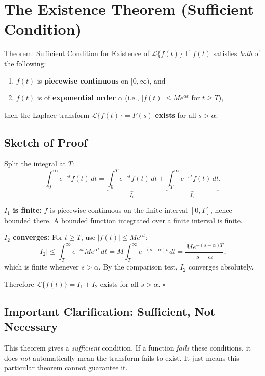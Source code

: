 \documentclass[12pt,a4paper]{article}
\begin{document}
\section{The Existence Theorem (Sufficient Condition)}

\begin{infobox}{Theorem: Sufficient Condition for Existence of $\mathcal{L}\{f(t)\}$}
If $f(t)$ satisfies \emph{both} of the following:
\begin{enumerate}[label=(\roman*)]
  \item $f(t)$ is \textbf{piecewise continuous} on $[0, \infty)$, and
  \item $f(t)$ is of \textbf{exponential order} $\alpha$ (i.e., $|f(t)| \leq M e^{\alpha t}$ for $t \geq T$),
\end{enumerate}
then the Laplace transform $\mathcal{L}\{f(t)\} = F(s)$ \textbf{exists} for all $s > \alpha$.
\end{infobox}

\subsection{Sketch of Proof}

Split the integral at $T$:
\[
  \int_0^{\infty} e^{-st} f(t)\, dt = \underbrace{\int_0^{T} e^{-st} f(t)\, dt}_{I_1} + \underbrace{\int_T^{\infty} e^{-st} f(t)\, dt}_{I_2}.
\]

\textbf{$I_1$ is finite:} $f$ is piecewise continuous on the finite interval $[0,T]$, hence bounded there. A bounded function integrated over a finite interval is finite.

\textbf{$I_2$ converges:} For $t \geq T$, use $|f(t)| \leq M e^{\alpha t}$:
\[
  |I_2| \leq \int_T^{\infty} e^{-st} M e^{\alpha t}\, dt = M \int_T^{\infty} e^{-(\text{s}-\alpha)t}\, dt = \frac{M e^{-(s-\alpha)T}}{s - \alpha},
\]
which is finite whenever $s > \alpha$. By the comparison test, $I_2$ converges absolutely.

Therefore $\mathcal{L}\{f(t)\} = I_1 + I_2$ exists for all $s > \alpha$. \hfill $\square$

\subsection{Important Clarification: Sufficient, Not Necessary}

This theorem gives a \emph{sufficient} condition. If a function \emph{fails} these conditions, it does \emph{not} automatically mean the transform fails to exist. It just means this particular theorem cannot guarantee it.
\end{document}
